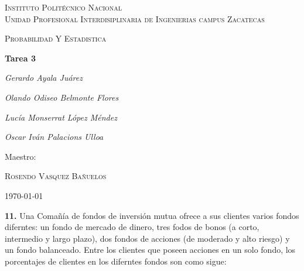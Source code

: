 \documentclass[12pt, letterpaper, spanish]{article}
\begin{document}
\begin{titlepage}
	\centering
	{\scshape\LARGE Instituto Politécnico Nacional\\ Unidad Profesional Interdisiplinaria de Ingenierias campus Zacatecas\par}
	\vspace{1cm}
	{\scshape\Large Probabilidad Y Estadistica\par}
	\vspace{1.5cm}
	{\huge\bfseries Tarea 3\par}
	\vspace{2cm}
	{\Large\itshape Gerardo Ayala Juárez\par}
	{\Large\itshape Olando Odiseo Belmonte Flores\par}
	{\Large\itshape Lucía Monserrat López Méndez\par}
	{\Large\itshape Oscar Iván Palacions Ulloa\par}
	\vfill
	Maestro:\par
	\textsc{
	Rosendo Vasquez Bañuelos}
	\vfill
	{\large \today \par}
\end{titlepage}

\textbf{11.} Una Comañía de fondos de inversión mutua ofrece a sus clientes varios fondos diferntes: un fondo de mercado de dinero, tres fodos de bonos (a corto, intermedio y largo plazo), dos fondos de acciones (de moderado y alto riesgo) y un fondo balanceado. Entre los clientes que poseen acciones en un solo fondo, los porcentajes de clientes en los diferntes fondos son como sigue:\\ \\
\end{document}
